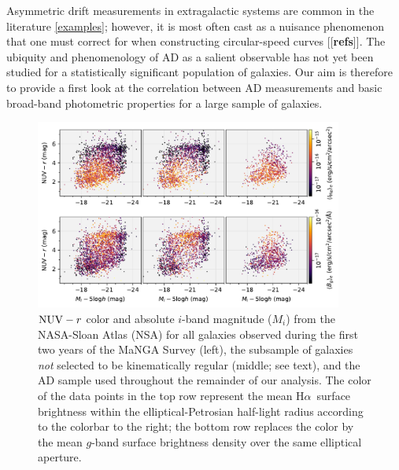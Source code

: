 \documentclass[apj,iop,revtex4,numberedappendix]{emulateapj}
\newcommand{\comment}[2][todo]{{\color{#1}[[{\bf #2}]]}}
\newcommand{\halpha}{H$\alpha$}
\begin{document}
Asymmetric drift measurements in extragalactic systems are common in the
literature \ref{examples}; however, it is most often cast as a nuisance
phenomenon that one must correct for when constructing circular-speed
curves \comment{refs}.  The ubiquity and phenomenology of AD as a
salient observable has not yet been studied for a statistically
significant population of galaxies.  Our aim is therefore to provide a
first look at the correlation between AD measurements and basic
broad-band photometric properties for a large sample of galaxies.

\begin{figure}
%
\begin{center}
%
\includegraphics[width=0.9\textwidth]{figs/cmd_flux.pdf}
%
\end{center}
%
\caption{
%
${\rm NUV} - r$ color and absolute $i$-band magnitude ($M_i$) from the
NASA-Sloan Atlas (NSA) for all galaxies observed during the first two
years of the MaNGA Survey (left), the subsample of galaxies {\em not}
selected to be kinematically regular (middle; see text), and the AD
sample used throughout the remainder of our analysis.  The color of the
data points in the top row represent the mean \halpha\ surface
brightness within the elliptical-Petrosian half-light radius according
to the colorbar to the right; the bottom row replaces the color by the
mean $g$-band surface brightness density over the same elliptical
aperture.
%
}
%
\label{fig:sample}
%
\end{figure}
\end{document}
